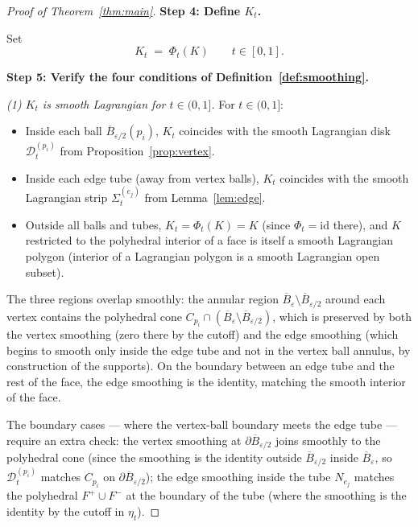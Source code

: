 \documentclass[12pt]{article}
\theoremstyle{definition}
\begin{document}
\begin{proof}[Proof of Theorem~\ref{thm:main}]
\smallskip\noindent\textbf{Step 4: Define $K_t$.}

Set
\begin{equation}\label{eq:Kt}
K_t \;=\; \Phi_t(K) \qquad t\in[0,1].
\end{equation}

\smallskip\noindent\textbf{Step 5: Verify the four conditions of Definition~\ref{def:smoothing}.}

\emph{(1) $K_t$ is smooth Lagrangian for $t\in(0,1]$.}
For $t\in(0,1]$:
\begin{itemize}
\item Inside each ball $\overline{B}_{\varepsilon/2}(p_i)$, $K_t$ coincides with the smooth Lagrangian disk $\mathcal{D}_t^{(p_i)}$ from Proposition~\ref{prop:vertex}.
\item Inside each edge tube (away from vertex balls), $K_t$ coincides with the smooth Lagrangian strip $\Sigma_t^{(e_j)}$ from Lemma~\ref{lem:edge}.
\item Outside all balls and tubes, $K_t=\Phi_t(K)=K$ (since $\Phi_t=\mathrm{id}$ there), and $K$ restricted to the polyhedral interior of a face is itself a smooth Lagrangian polygon (interior of a Lagrangian polygon is a smooth Lagrangian open subset).
\end{itemize}
The three regions overlap smoothly: the annular region $\overline{B}_\varepsilon\setminus\overline{B}_{\varepsilon/2}$ around each vertex contains the polyhedral cone $C_{p_i}\cap(\overline{B}_\varepsilon\setminus\overline{B}_{\varepsilon/2})$, which is preserved by both the vertex smoothing (zero there by the cutoff) and the edge smoothing (which begins to smooth only inside the edge tube and not in the vertex ball annulus, by construction of the supports). On the boundary between an edge tube and the rest of the face, the edge smoothing is the identity, matching the smooth interior of the face.

The boundary cases — where the vertex-ball boundary meets the edge tube — require an extra check: the vertex smoothing at $\partial\overline{B}_{\varepsilon/2}$ joins smoothly to the polyhedral cone (since the smoothing is the identity outside $\overline{B}_{\varepsilon/2}$ inside $\overline{B}_\varepsilon$, so $\mathcal{D}_t^{(p_i)}$ matches $C_{p_i}$ on $\partial\overline{B}_{\varepsilon/2}$); the edge smoothing inside the tube $N_{e_j}$ matches the polyhedral $F^+\cup F^-$ at the boundary of the tube (where the smoothing is the identity by the cutoff in $\eta_t$).


\end{proof}
\end{document}
